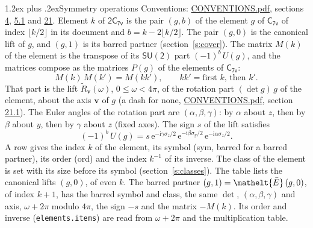 \documentclass[10pt,a4paper]{article}
\makeatletter
\renewcommand\section{\@startsection{section}{1}{\z@}{-3ex plus -1ex minus -.2ex}%
  {1.2ex plus .2ex}{\normalfont\large\sffamily\bfseries\color{parttitle}}}
\numberwithin{equation}{section}
\newcommand{\eltfont}[1]{{\let\sigma\eltsigma\mathelt{#1}}}
\newcommand{\grp}[1]{\mathsf{#1}}
\newcommand{\elt}[1]{\eltfont{#1}}
\newcommand{\vv}{\mathbf{v}}
\newcommand{\iunit}{\mathrm{i}}
\newcommand{\expe}{\mathrm{e}}
\newcommand{\barred}[1]{\bar{#1}}
\newcommand{\lift}[1]{\tilde{#1}}
\newcommand{\pauli}[1]{\sigma_{#1}}
\makeatother
\begin{document}
\section{Symmetry operations}\label{s:elements}
Conventions: \href{../../CONVENTIONS.pdf}{CONVENTIONS.pdf}, sections \href{../../../rotation/CONVENTIONS.pdf\#conv.4}{4}, \href{../../../rotation/CONVENTIONS.pdf\#conv.5.1}{5.1} and \href{../../CONVENTIONS.pdf\#conv.21}{21}.
\leavevmode\label{n:index.element}\label{n:element.g}Element $k$ of $\grp{2C_{7v}}$ is the pair $(g, b)$ of the element $g$ of \href{../../../rotation/data/pdf/C7v.pdf}{$\grp{C_{7v}}$} of index $\lfloor k/2\rfloor$ in its document and $b = k - 2\lfloor k/2\rfloor$. The pair $(g, 0)$ is the canonical lift of $g$, and $(g, 1)$ is its barred partner (section~\ref{s:cover}). \label{n:matrix.element.pin}\label{n:matrix.element}The matrix $M(k)$ of the element is the transpose of its $\grp{SU(2)}$ part $(-1)^{b}\,U(g)$, and the matrices compose as the matrices $P(g)$ of the elements of $\grp{C_{7v}}$:
\begin{equation}\label{e:mprod}M(k)\,M(k') = M(kk'),\qquad kk' = \text{first } k\text{, then } k'.\end{equation}
\leavevmode\label{n:angle.omega}\label{n:vector.axis}\label{n:vector.pole}That part is the lift $\lift{R}_{\vv}(\omega)$, $0 \le \omega < 4\pi$, of the rotation part $(\det g)\,g$ of the element, about the axis $\vv$ of $g$ (a dash for none, \href{../../CONVENTIONS.pdf}{CONVENTIONS.pdf}, section \href{../../CONVENTIONS.pdf\#conv.21.1}{21.1}). \label{n:angle.euler.alpha}\label{n:angle.euler.beta}\label{n:angle.euler.gamma}\label{n:vector.coordinates}The Euler angles of the rotation part are $(\alpha,\beta,\gamma)$: by $\alpha$ about $z$, then by $\beta$ about $y$, then by $\gamma$ about $z$ (fixed axes). \label{n:local.euler.sign}The sign $s$ of the lift satisfies
\begin{equation}\label{e:euler}(-1)^{b}\,U(g) = s\,\expe^{-\iunit\gamma\pauli{z}/2}\,\expe^{-\iunit\beta\pauli{y}/2}\,\expe^{-\iunit\alpha\pauli{z}/2}.\end{equation}
\leavevmode\label{n:index.element.inverse}\label{n:head.sym}\label{n:head.ord}A row gives the index $k$ of the element, its symbol (sym, barred for a barred partner), its order (ord) and the index $k^{-1}$ of its inverse. \label{n:head.class}The class of the element is set with its size before its symbol (section~\ref{s:classes}).
The table lists the canonical lifts $(g, 0)$, of even $k$. The barred partner $(g, 1) = \elt{\barred{E}}\,(g, 0)$, of index $k + 1$, has the barred symbol and class, the same $\det$, $(\alpha,\beta,\gamma)$ and axis, $\omega + 2\pi$ modulo $4\pi$, the sign $-s$ and the matrix $-M(k)$. Its order and inverse (\texttt{elements.items}) are read from $\omega + 2\pi$ and the multiplication table.
\end{document}
